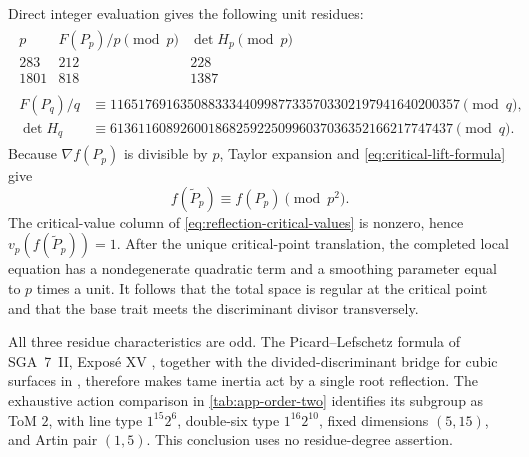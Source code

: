 Direct integer evaluation gives the following unit residues:
\begin{equation}
\begin{gathered}
\begin{array}{c|c|c}
p&F(P_p)/p\pmod p&\det H_p\pmod p\\ \hline
283&212&228\\
1801&818&1387
\end{array}\\[4pt]
\begin{aligned}
F(P_q)/q&\equiv
11651769163508833344099877335703302197941640200357\pmod q,\\
\det H_q&\equiv
6136116089260018682592250996037036352166217747437\pmod q.
\end{aligned}
\end{gathered}
\label{eq:reflection-critical-values}
\end{equation}
Because $\nabla f(P_p)$ is divisible by $p$, Taylor expansion and
\cref{eq:critical-lift-formula} give
\[
 f(\widetilde P_p)\equiv f(P_p)\pmod {p^2}.
\]
The critical-value column of \cref{eq:reflection-critical-values} is
nonzero, hence
$v_p(f(\widetilde P_p))=1$.  After the unique critical-point translation,
the completed local equation has a nondegenerate quadratic term and a
smoothing parameter equal to $p$ times a unit.  It follows that the total
space is regular at the critical point and that the base trait meets the
discriminant divisor transversely.

All three residue characteristics are odd.  The Picard--Lefschetz formula
of SGA~7~II, Expos\'e XV \citep{sga7ii1973}, together with the
divided-discriminant bridge for cubic surfaces in
\citet[Proposition~2.3, p.~858; Theorem~3.5, pp.~864--866;
cubic-surface specialization, p.~870]
{saito2012discriminant}, therefore makes tame inertia act by a single root
reflection.  The exhaustive action comparison in
\cref{tab:app-order-two} identifies its subgroup as ToM $2$, with line type
$1^{15}2^6$, double-six type $1^{16}2^{10}$, fixed dimensions $(5,15)$,
and Artin pair $(1,5)$.  This conclusion uses no residue-degree assertion.
